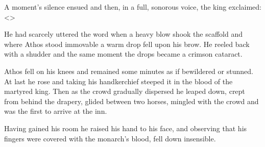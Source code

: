 A moment's silence ensued and then, in a full, sonorous voice, the king exclaimed: <>

He had scarcely uttered the word when a heavy blow shook the scaffold and where Athos stood immovable a warm drop fell upon his brow. He reeled back with a shudder and the same moment the drops became a crimson cataract.

Athos fell on his knees and remained some minutes as if bewildered or stunned. At last he rose and taking his handkerchief steeped it in the blood of the martyred king. Then as the crowd gradually dispersed he leaped down, crept from behind the drapery, glided between two horses, mingled with the crowd and was the first to arrive at the inn.

Having gained his room he raised his hand to his face, and observing that his fingers were covered with the monarch's blood, fell down insensible. 